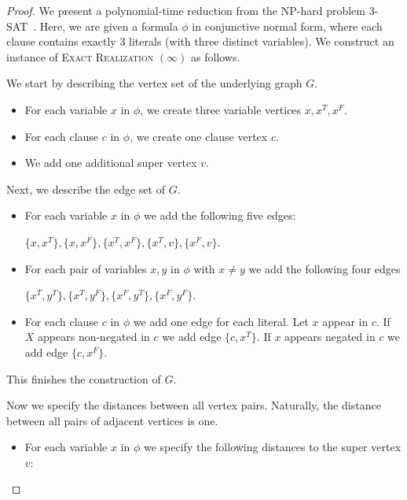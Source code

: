 \documentclass[11pt,a4paper]{article}
\theoremstyle{remark}
\theoremstyle{definition}
\begin{document}
\begin{proof}
	We present a polynomial-time reduction from the NP-hard problem 3-SAT~\cite{Karp1972Reducibility}. Here, we are given a formula $\phi$ in conjunctive normal form, where each clause contains exactly 3 literals (with three distinct variables). We construct an instance of \textsc{Exact Realization $(\infty)$} as follows.

 We start by describing the vertex set of the underlying graph $G$.
\begin{itemize}
\item For each variable $x$ in $\phi$, we create three variable vertices $x, x^T, x^F$.
\item For each clause $c$ in $\phi$, we create one clause vertex $c$.
\item We add one additional super vertex $v$.
\end{itemize}
Next, we describe the edge set of $G$.
\begin{itemize}
\item For each variable $x$ in $\phi$ we add the following five edges: 

$\{x, x^T\}, \{x, x^F\}, \{x^T, x^F\}, \{x^T, v\}, \{x^F,v\}$.
\item For each pair of variables $x,y$ in $\phi$ with $x\neq y$ we add the following four edges 

$\{x^T,y^T\},\{x^T,y^F\}, \{x^F,y^T\},\{x^F,y^F\}$.
\item For each clause $c$ in $\phi$ we add one edge for each literal. Let $x$ appear in $c$. If $X$ appears non-negated in $c$ we add edge $\{c,x^T\}$. If $x$ appears negated in $c$ we add edge $\{c, x^F\}$.
\end{itemize}
This finishes the construction of $G$.

Now we specify the distances between all vertex pairs. Naturally, the distance between all pairs of adjacent vertices is one.
\begin{itemize}
    

    \item For each variable $x$ in $\phi$ we specify the following distances to the super vertex $v$:


\end{itemize}
\end{proof}
\end{document}

